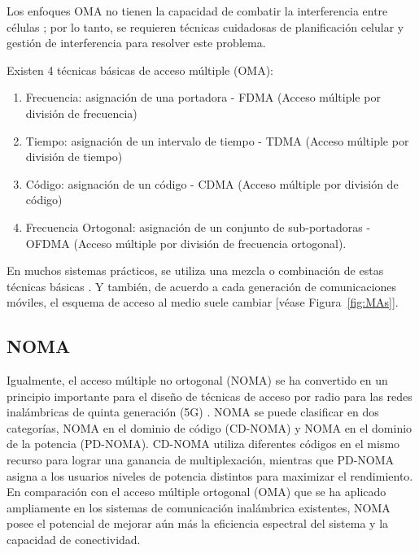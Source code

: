 Los enfoques OMA no tienen la capacidad de combatir la interferencia entre células \parencite{Shirvanimoghaddam2017}; por lo tanto, se requieren técnicas cuidadosas de planificación celular y gestión de interferencia para resolver este problema. \newline

Existen 4 técnicas básicas de acceso múltiple (OMA):

\begin{enumerate}
\item  Frecuencia: asignación de una portadora - FDMA (Acceso múltiple por división de frecuencia)
\item  Tiempo: asignación de un intervalo de tiempo - TDMA (Acceso múltiple por división de tiempo)
\item  Código: asignación de un código - CDMA (Acceso múltiple por división de código)
\item  Frecuencia Ortogonal: asignación de un conjunto de sub-portadoras - OFDMA (Acceso múltiple por división de frecuencia ortogonal).
\end{enumerate}

En muchos sistemas prácticos, se utiliza una mezcla o combinación de estas técnicas básicas \parencite{Correia2018}. Y también, de acuerdo a cada generación de comunicaciones móviles, el esquema de acceso al medio suele cambiar [véase Figura~\ref{fig:MAs}].

\subsection{NOMA}\label{NOMA_C2}

Igualmente, el acceso múltiple no ortogonal (NOMA) se ha convertido en un principio importante para el diseño de técnicas de acceso por radio para las redes inalámbricas de quinta generación (5G) \parencite{DIng2017}. NOMA se puede clasificar en dos categorías, NOMA en el dominio de código (CD-NOMA) y NOMA en el dominio de la potencia (PD-NOMA). CD-NOMA utiliza diferentes códigos en el mismo recurso para lograr una ganancia de multiplexación, mientras que PD-NOMA asigna a los usuarios niveles de potencia distintos para maximizar el rendimiento. En comparación con el acceso múltiple ortogonal (OMA) que se ha aplicado ampliamente en los sistemas de comunicación inalámbrica existentes, NOMA posee el potencial de mejorar aún más la eficiencia espectral del sistema y la capacidad de conectividad.\newline

